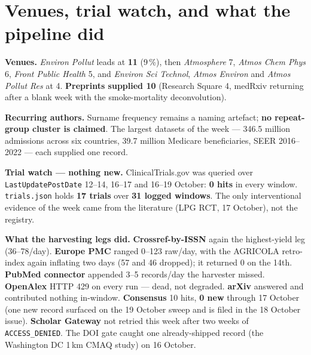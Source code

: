\documentclass[10pt]{article}
\begin{document}
\vspace{4mm}

\section*{\sffamily\bfseries\color{Deep}Venues, trial watch, and what the pipeline did}
\vspace{-1.5mm}{\color{Teal}\rule{\linewidth}{1.1pt}}\vspace{2.5mm}

\footnotesize
\textbf{Venues.} \textit{Environ Pollut} leads at \textbf{11} (9\,\%), then \textit{Atmosphere} 7,
\textit{Atmos Chem Phys} 6, \textit{Front Public Health} 5, and \textit{Environ Sci Technol},
\textit{Atmos Environ} and \textit{Atmos Pollut Res} at 4. \textbf{Preprints supplied 10} (Research
Square 4, medRxiv returning after a blank week with the smoke-mortality deconvolution).

\vspace{1.5mm}
\textbf{Recurring authors.} Surname frequency remains a naming artefact; \textbf{no repeat-group cluster is
claimed}. The largest datasets of the week --- 346.5 million admissions across six countries, 39.7
million Medicare beneficiaries, SEER 2016--2022 --- each supplied one record.

\vspace{1.5mm}
\textbf{Trial watch --- nothing new.} ClinicalTrials.gov was queried over \texttt{LastUpdatePostDate}
12--14, 16--17 and 16--19 October: \textbf{0 hits} in every window. \texttt{trials.json} holds
\textbf{17 trials} over \textbf{31 logged windows}. The only interventional evidence of the week came from
the literature (LPG RCT, 17 October), not the registry.

\vspace{1.5mm}
\textbf{What the harvesting legs did.} \textbf{Crossref-by-ISSN} again the highest-yield leg (36--78/day).
\textbf{Europe PMC} ranged 0--123 raw/day, with the AGRICOLA retro-index again inflating two days (57 and
46 dropped); it returned 0 on the 14th. \textbf{PubMed connector} appended 3--5 records/day the harvester
missed. \textbf{OpenAlex} HTTP 429 on every run --- dead, not degraded. \textbf{arXiv} answered and
contributed nothing in-window. \textbf{Consensus} 10 hits, \textbf{0 new} through 17 October (one new
record surfaced on the 19 October sweep and is filed in the 18 October issue). \textbf{Scholar Gateway}
not retried this week after two weeks of \texttt{ACCESS\_DENIED}. The DOI gate caught one already-shipped
record (the Washington DC 1\,km CMAQ study) on 16 October.
\end{document}
